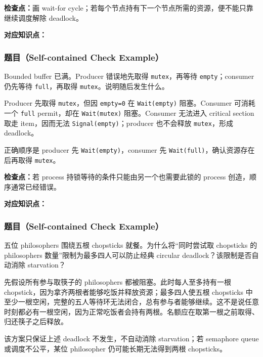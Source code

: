 \textbf{检查点：}画 wait-for cycle；若每个节点持有下一个节点所需的资源，便不能只靠继续调度解除 deadlock。


\textbf{对应知识点：}

\subsubsection*{题目（Self-contained Check Example）}

Bounded buffer 已满。Producer 错误地先取得 \texttt{mutex}，再等待 \texttt{empty}；consumer 仍先等待 \texttt{full}，再取得 \texttt{mutex}。说明随后发生什么。

\begin{checkedsolution}
Producer 先取得 \texttt{mutex}，但因 \texttt{empty=0} 在 \texttt{Wait(empty)} 阻塞。Consumer 可消耗一个 \texttt{full} permit，却在 \texttt{Wait(mutex)} 阻塞。Consumer 无法进入 critical section 取走 item，因而无法 \texttt{Signal(empty)}；producer 也不会释放 \texttt{mutex}，形成 deadlock。

正确顺序是 producer 先 \texttt{Wait(empty)}，consumer 先 \texttt{Wait(full)}，确认资源存在后再取得 \texttt{mutex}。
\end{checkedsolution}

\textbf{检查点：}若 process 持锁等待的条件只能由另一个也需要此锁的 process 创造，顺序通常已经错误。


\textbf{对应知识点：}

\subsubsection*{题目（Self-contained Check Example）}

五位 philosophers 围绕五根 chopsticks 就餐。为什么将“同时尝试取 chopsticks 的 philosophers 数量”限制为最多四人可以防止经典 circular deadlock？该限制是否自动消除 starvation？

\begin{checkedsolution}
先假设所有参与取筷子的 philosophers 都被阻塞。此时每人至多持有一根 chopstick，因为拿齐两根者能够吃饭并释放资源；最多四人使五根 chopsticks 中至少一根空闲，完整的五人等待环无法闭合，总有参与者能够继续。这不是说任意时刻都必有一根空闲，因为正常吃饭者会持有两根。名额应在取第一根之前取得、归还筷子之后释放。

该方案只保证上述 deadlock 不发生，不自动消除 starvation；若 semaphore queue 或调度不公平，某位 philosopher 仍可能长期无法得到两根 chopsticks。
\end{checkedsolution}

